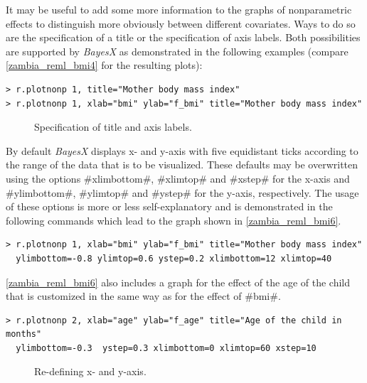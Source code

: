 It may be useful to add some more information to the graphs of
nonparametric effects to distinguish more obviously between
different covariates. Ways to do so are the specification of a
title or the specification of axis labels. Both possibilities are
supported by {\it BayesX} as demonstrated in the following
examples (compare \autoref{zambia_reml_bmi4} for the resulting
plots):

\begin{verbatim}
> r.plotnonp 1, title="Mother body mass index"
> r.plotnonp 1, xlab="bmi" ylab="f_bmi" title="Mother body mass index"
\end{verbatim}

\begin{figure}[ht]
\begin{center}
\begin{multicols}{2}
\end{multicols}
{\it\caption{Specification of title and axis
labels.\label{zambia_reml_bmi4}}}
\end{center}
\end{figure}

By default {\it BayesX} displays x- and y-axis with five
equidistant ticks according to the range of the data that is to be
visualized. These defaults may be overwritten using the options
#xlimbottom#, #xlimtop# and #xstep# for the x-axis and
#ylimbottom#, #ylimtop# and #ystep# for the y-axis, respectively.
The usage of these options is more or less self-explanatory and is
demonstrated in the following commands which lead to the graph
shown in \autoref{zambia_reml_bmi6}.

\begin{verbatim}
> r.plotnonp 1, xlab="bmi" ylab="f_bmi" title="Mother body mass index"
  ylimbottom=-0.8 ylimtop=0.6 ystep=0.2 xlimbottom=12 xlimtop=40
\end{verbatim}

\autoref{zambia_reml_bmi6} also includes a graph for the effect of
the age of the child that is customized in the same way as for the
effect of #bmi#.

\begin{verbatim}
> r.plotnonp 2, xlab="age" ylab="f_age" title="Age of the child in months"
  ylimbottom=-0.3  ystep=0.3 xlimbottom=0 xlimtop=60 xstep=10
\end{verbatim}

\begin{figure}[ht]
\begin{center}
{\it\caption{Re-defining x- and y-axis.\label{zambia_reml_bmi6}}}
\end{center}
\end{figure}

